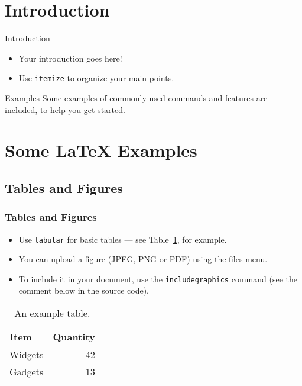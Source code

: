\documentclass[12pt]{beamer}
\begin{document}
{ %
\begin{frame}
  \titlepage
\end{frame}
}

\section{Introduction}

\begin{frame}{Introduction}

\begin{itemize}
  \item Your introduction goes here!
  \item Use \texttt{itemize} to organize your main points.
\end{itemize}

\vskip 1cm

\begin{block}{Examples}
Some examples of commonly used commands and features are included, to help you get started.
\end{block}

\end{frame}

\section{Some \LaTeX{} Examples}

\subsection{Tables and Figures}

\begin{frame}
  \frametitle{Tables and Figures}

\begin{itemize}
\item Use \texttt{tabular} for basic tables --- see Table~\ref{tab:widgets}, for example.
\item You can upload a figure (JPEG, PNG or PDF) using the files menu. 
\item To include it in your document, use the \texttt{includegraphics} command (see the comment below in the source code).
\end{itemize}


\begin{table}
\centering
\begin{tabular}{l|r}
Item & Quantity \\\hline
Widgets & 42 \\
Gadgets & 13
\end{tabular}
\caption{\label{tab:widgets}An example table.}
\end{table}

\end{frame}
\end{document}
